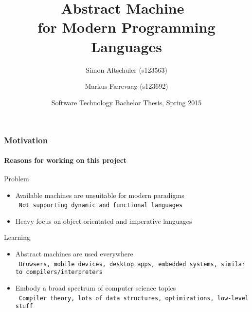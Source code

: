 \documentclass[handout]{beamer}
\title{Abstract Machine~\\for Modern Programming Languages}
\author[Altschuler, Færevaag]{Simon Altschuler (s123563) \and Markus Færevaag (s123692)}
\date{Software Technology Bachelor Thesis, Spring 2015}
\newcommand{\n}[1]{\\~\texttt{\color{red}\tiny #1}}
\begin{document}
\frame{\titlepage}

\begin{frame}
  \frametitle{Motivation}
  \framesubtitle{Reasons for working on this project}

  Problem
  \begin{itemize}
  \item Available machines are unsuitable for modern paradigms
    \n{Not supporting dynamic and functional languages}
  \item Heavy focus on object-orientated and imperative languages
  \end{itemize}

  \pause{}

  \vspace{20pt}
  Learning
  \begin{itemize}
  \item Abstract machines are used everywhere
    \n{Browsers, mobile devices, desktop apps, embedded systems, similar to compilers/interpreters}
  \item Embody a broad spectrum of computer science topics
    \n{Compiler theory, lots of data structures, optimizations, low-level stuff}
  \end{itemize}

\end{frame}
\end{document}
